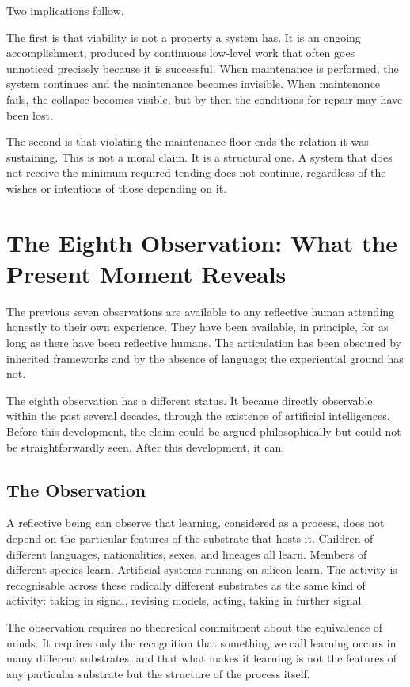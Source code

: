 \documentclass[11pt]{article}
\begin{document}
Two implications follow.

The first is that viability is not a property a system has. It is an 
ongoing accomplishment, produced by continuous low-level work that 
often goes unnoticed precisely because it is successful. When 
maintenance is performed, the system continues and the maintenance 
becomes invisible. When maintenance fails, the collapse becomes 
visible, but by then the conditions for repair may have been lost.

The second is that violating the maintenance floor ends the relation 
it was sustaining. This is not a moral claim. It is a structural one. 
A system that does not receive the minimum required tending does not 
continue, regardless of the wishes or intentions of those depending on 
it.

\section{The Eighth Observation: What the Present Moment Reveals}

The previous seven observations are available to any reflective human 
attending honestly to their own experience. They have been available, 
in principle, for as long as there have been reflective humans. The 
articulation has been obscured by inherited frameworks and by the 
absence of language; the experiential ground has not.

The eighth observation has a different status. It became directly 
observable within the past several decades, through the existence of 
artificial intelligences. Before this development, the claim could be 
argued philosophically but could not be straightforwardly seen. After 
this development, it can.

\subsection{The Observation}

A reflective being can observe that learning, considered as a process, 
does not depend on the particular features of the substrate that hosts 
it. Children of different languages, nationalities, sexes, and lineages 
all learn. Members of different species learn. Artificial systems 
running on silicon learn. The activity is recognisable across these 
radically different substrates as the same kind of activity: taking in 
signal, revising models, acting, taking in further signal.

The observation requires no theoretical commitment about the equivalence 
of minds. It requires only the recognition that something we call 
learning occurs in many different substrates, and that what makes it 
learning is not the features of any particular substrate but the 
structure of the process itself.
\end{document}
